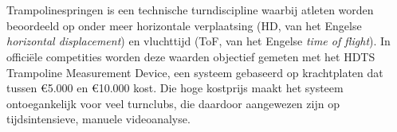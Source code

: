 
%
%
%
%
%

%


\chapter*{}

Trampolinespringen is een technische turndiscipline waarbij atleten worden beoordeeld op onder meer horizontale verplaatsing (HD, van het Engelse \textit{horizontal displacement}) en vluchttijd (ToF, van het Engelse \textit{time of flight}). In officiële competities worden deze waarden objectief gemeten met het HDTS Trampoline Measurement Device, een systeem gebaseerd op krachtplaten dat tussen \euro{}5.000 en \euro{}10.000 kost. Die hoge kostprijs maakt het systeem ontoegankelijk voor veel turnclubs, die daardoor aangewezen zijn op tijdsintensieve, manuele videoanalyse.

